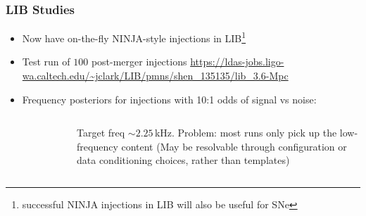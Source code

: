 \documentclass{beamer}
\begin{document}
\begin{frame}
    \frametitle{LIB Studies}
    {\small 
    \begin{itemize}
        \item Now have on-the-fly NINJA-style injections in
            LIB\footnote{successful NINJA injections in LIB will also be useful
            for SNe}
        \item Test run of $100$ post-merger injections
            {\tiny
            \url{https://ldas-jobs.ligo-wa.caltech.edu/~jclark/LIB/pmns/shen_135135/lib_3.6-Mpc}}
        \item Frequency posteriors for injections with 10:1 odds of signal vs noise:
    \end{itemize}
}

\begin{columns}[]

    \begin{center}
        \vspace{-1.1cm}
        \begin{figure}
            \centering
        \end{figure}
    \end{center}

    \begin{center}
        Target freq $\sim2.25$\,kHz.  Problem: most runs only pick up the
        low-frequency content (May be resolvable through configuration or data
        conditioning choices, rather than templates)
    \end{center}

\end{columns}

\end{frame}
\end{document}
